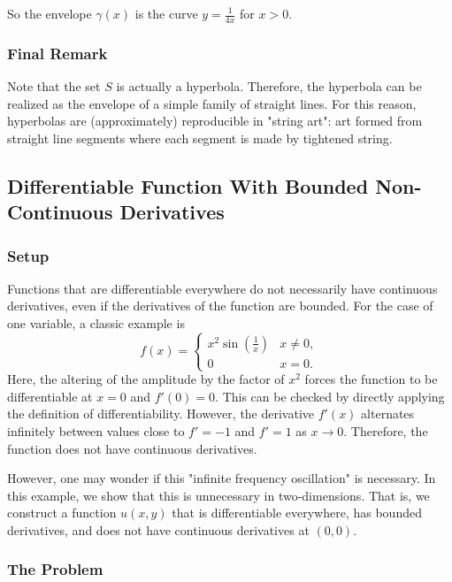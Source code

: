 So the envelope \(\gamma(x)\) is the curve \(y = \frac{1}{4x}\) for \(x > 0\).  

\subsubsection*{Final Remark}

Note that the set \(S\) is actually a hyperbola. Therefore, the hyperbola can be realized as the envelope of a simple family of straight lines. For this reason, hyperbolas are (approximately) reproducible in "string art": art formed from
straight line segments where each segment is made by tightened string.

\subsection{Differentiable Function With Bounded Non-Continuous Derivatives}

\subsubsection*{Setup}

Functions that are differentiable everywhere do not necessarily have continuous derivatives, even if the derivatives of the function are bounded. For the case of one variable, a classic example is
\begin{equation}
f(x) = \begin{cases}
    x^2 \sin(\frac{1}{x}) & x\neq 0,\\
    0 & x = 0.
    \end{cases}
\end{equation}
Here, the altering of the amplitude by the factor of \(x^2\) forces the function to be differentiable at \(x = 0\) and \(f'(0) = 0\). This can be checked by directly applying the definition of differentiability. However, the derivative \(f'(x)\) alternates infinitely between values close to \(f' = -1\) and \(f' = 1\) as \(x \to 0\). Therefore, the function does not have continuous derivatives.

However, one may wonder if this "infinite frequency oscillation" is necessary. In this example, we show that this is unnecessary in two-dimensions. That is, we construct a function \(u(x,y)\) that is 
differentiable everywhere, has bounded derivatives, and does not have continuous derivatives at \((0,0)\).

\subsubsection*{The Problem}

